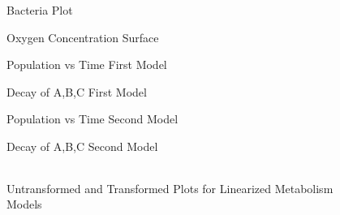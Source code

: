 \documentclass{article}
\begin{document}
\begin{figure}[h!]
\begin{center}
\caption{Bacteria Plot}
\end{center}
\end{figure}

\begin{figure}[h!]
\begin{center}
\caption{Oxygen Concentration Surface}
\end{center}
\end{figure}

\begin{figure}[h!]
\begin{center}
\caption{Population vs Time First Model}
\end{center}
\end{figure}


\begin{figure}[h!]
\begin{center}
\caption{Decay of A,B,C First Model}
\end{center}
\end{figure}


\begin{figure}[h!]
\begin{center}
\caption{Population vs Time Second Model}
\end{center}
\end{figure}



\begin{figure}[h!]
\begin{center}
\caption{Decay of A,B,C Second Model}
\end{center}
\end{figure}




\begin{sidewaysfigure}[h!]
\begin{center}
\begin{tabular}{ccc}
\end{tabular}
\end{center}
\caption{Untransformed and Transformed Plots for Linearized Metabolism Models}
\end{sidewaysfigure}
\end{document}
